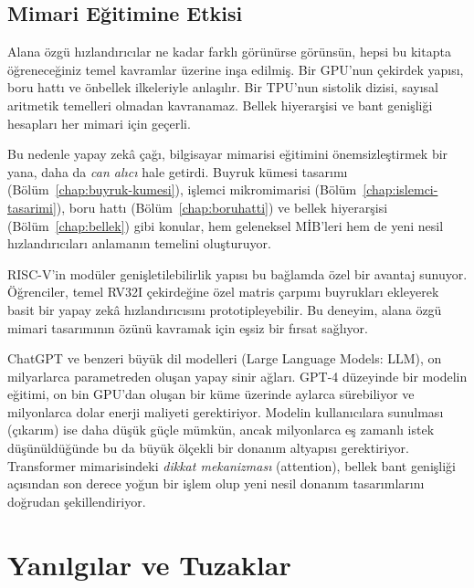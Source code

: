 \subsection{Mimari Eğitimine Etkisi}
\label{sec:degisim-egitim}

Alana özgü hızlandırıcılar ne kadar farklı görünürse görünsün, hepsi bu kitapta öğreneceğiniz temel kavramlar üzerine inşa edilmiş. Bir GPU'nun çekirdek yapısı, boru hattı ve önbellek ilkeleriyle anlaşılır. Bir TPU'nun sistolik dizisi, sayısal aritmetik temelleri olmadan kavranamaz. Bellek hiyerarşisi ve bant genişliği hesapları her mimari için geçerli.

Bu nedenle yapay zekâ çağı, bilgisayar mimarisi eğitimini önemsizleştirmek bir yana, daha da \emph{can alıcı} hale getirdi. Buyruk kümesi tasarımı (Bölüm~\ref{chap:buyruk-kumesi}), işlemci mikromimarisi (Bölüm~\ref{chap:islemci-tasarimi}), boru hattı (Bölüm~\ref{chap:boruhatti}) ve bellek hiyerarşisi (Bölüm~\ref{chap:bellek}) gibi konular, hem geleneksel MİB'leri hem de yeni nesil hızlandırıcıları anlamanın temelini oluşturuyor.

RISC-V'in modüler genişletilebilirlik yapısı bu bağlamda özel bir avantaj sunuyor. Öğrenciler, temel RV32I çekirdeğine özel matris çarpımı buyrukları ekleyerek basit bir yapay zekâ hızlandırıcısını prototipleyebilir. Bu deneyim, alana özgü mimari tasarımının özünü kavramak için eşsiz bir fırsat sağlıyor.

\begin{bilginot}
ChatGPT ve benzeri büyük dil modelleri (Large Language Models: LLM), on milyarlarca parametreden oluşan yapay sinir ağları. GPT-4 düzeyinde bir modelin eğitimi, on bin GPU'dan oluşan bir küme üzerinde aylarca sürebiliyor ve milyonlarca dolar enerji maliyeti gerektiriyor. Modelin kullanıcılara sunulması (çıkarım) ise daha düşük güçle mümkün, ancak milyonlarca eş zamanlı istek düşünüldüğünde bu da büyük ölçekli bir donanım altyapısı gerektiriyor. Transformer mimarisindeki \emph{dikkat mekanizması} (attention), bellek bant genişliği açısından son derece yoğun bir işlem olup yeni nesil donanım tasarımlarını doğrudan şekillendiriyor.
\end{bilginot}


\section{Yanılgılar ve Tuzaklar}
\label{sec:giris-yanilgilar}

